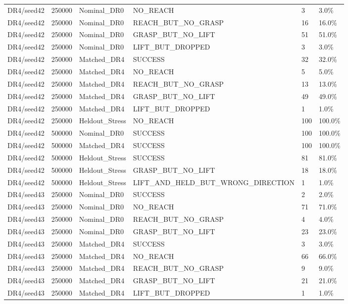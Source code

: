 \documentclass[11pt,a4paper,oneside]{book}
\begin{document}
\begin{longtable}{l l l l l l}
DR4/seed42 & 250000 & Nominal\_DR0 & NO\_REACH & 3 & 3.0\% \\
DR4/seed42 & 250000 & Nominal\_DR0 & REACH\_BUT\_NO\_GRASP & 16 & 16.0\% \\
DR4/seed42 & 250000 & Nominal\_DR0 & GRASP\_BUT\_NO\_LIFT & 51 & 51.0\% \\
DR4/seed42 & 250000 & Nominal\_DR0 & LIFT\_BUT\_DROPPED & 3 & 3.0\% \\
DR4/seed42 & 250000 & Matched\_DR4 & SUCCESS & 32 & 32.0\% \\
DR4/seed42 & 250000 & Matched\_DR4 & NO\_REACH & 5 & 5.0\% \\
DR4/seed42 & 250000 & Matched\_DR4 & REACH\_BUT\_NO\_GRASP & 13 & 13.0\% \\
DR4/seed42 & 250000 & Matched\_DR4 & GRASP\_BUT\_NO\_LIFT & 49 & 49.0\% \\
DR4/seed42 & 250000 & Matched\_DR4 & LIFT\_BUT\_DROPPED & 1 & 1.0\% \\
DR4/seed42 & 250000 & Heldout\_Stress & NO\_REACH & 100 & 100.0\% \\
DR4/seed42 & 500000 & Nominal\_DR0 & SUCCESS & 100 & 100.0\% \\
DR4/seed42 & 500000 & Matched\_DR4 & SUCCESS & 100 & 100.0\% \\
DR4/seed42 & 500000 & Heldout\_Stress & SUCCESS & 81 & 81.0\% \\
DR4/seed42 & 500000 & Heldout\_Stress & GRASP\_BUT\_NO\_LIFT & 18 & 18.0\% \\
DR4/seed42 & 500000 & Heldout\_Stress & LIFT\_AND\_HELD\_BUT\_WRONG\_DIRECTION & 1 & 1.0\% \\
DR4/seed43 & 250000 & Nominal\_DR0 & SUCCESS & 2 & 2.0\% \\
DR4/seed43 & 250000 & Nominal\_DR0 & NO\_REACH & 71 & 71.0\% \\
DR4/seed43 & 250000 & Nominal\_DR0 & REACH\_BUT\_NO\_GRASP & 4 & 4.0\% \\
DR4/seed43 & 250000 & Nominal\_DR0 & GRASP\_BUT\_NO\_LIFT & 23 & 23.0\% \\
DR4/seed43 & 250000 & Matched\_DR4 & SUCCESS & 3 & 3.0\% \\
DR4/seed43 & 250000 & Matched\_DR4 & NO\_REACH & 66 & 66.0\% \\
DR4/seed43 & 250000 & Matched\_DR4 & REACH\_BUT\_NO\_GRASP & 9 & 9.0\% \\
DR4/seed43 & 250000 & Matched\_DR4 & GRASP\_BUT\_NO\_LIFT & 21 & 21.0\% \\
DR4/seed43 & 250000 & Matched\_DR4 & LIFT\_BUT\_DROPPED & 1 & 1.0\% \\

\end{longtable}
\end{document}
